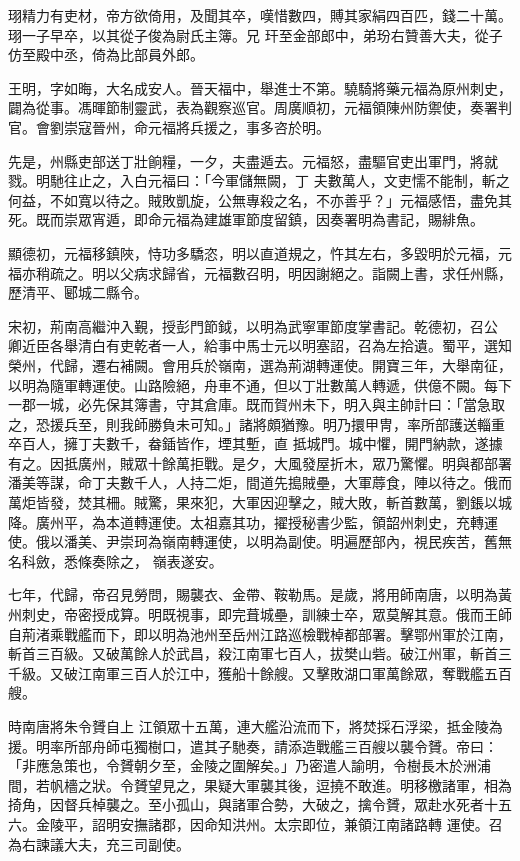 \begin{pinyinscope}
 珝精力有吏材，帝方欲倚用，及聞其卒，嘆惜數四，賻其家絹四百匹，錢二十萬。珝一子早卒，以其從子俊為尉氏主簿。兄
 玕至金部郎中，弟玢右贊善大夫，從子仿至殿中丞，倚為比部員外郎。



 王明，字如晦，大名成安人。晉天福中，舉進士不第。驍騎將藥元福為原州刺史，闢為從事。馮暉節制靈武，表為觀察巡官。周廣順初，元福領陳州防禦使，奏署判官。會劉崇寇晉州，命元福將兵援之，事多咨於明。



 先是，州縣吏部送丁壯餉糧，一夕，夫盡遁去。元福怒，盡驅官吏出軍門，將就戮。明馳往止之，入白元福曰：「今軍儲無闕，丁
 夫數萬人，文吏懦不能制，斬之何益，不如寬以待之。賊敗凱旋，公無專殺之名，不亦善乎？」元福感悟，盡免其死。既而崇眾宵遁，即命元福為建雄軍節度留鎮，因奏署明為書記，賜緋魚。



 顯德初，元福移鎮陜，恃功多驕恣，明以直道規之，忤其左右，多毀明於元福，元福亦稍疏之。明以父病求歸省，元福數召明，明因謝絕之。詣闕上書，求任州縣，歷清平、郾城二縣令。



 宋初，荊南高繼沖入覲，授彭門節鉞，以明為武寧軍節度掌書記。乾德初，召公
 卿近臣各舉清白有吏乾者一人，給事中馬士元以明塞詔，召為左拾遺。蜀平，選知榮州，代歸，遷右補闕。會用兵於嶺南，選為荊湖轉運使。開寶三年，大舉南征，以明為隨軍轉運使。山路險絕，舟車不通，但以丁壯數萬人轉遞，供億不闕。每下一郡一城，必先保其簿書，守其倉庫。既而賀州未下，明入與主帥計曰：「當急取之，恐援兵至，則我師勝負未可知。」諸將頗猶豫。明乃擐甲冑，率所部護送輜重卒百人，擁丁夫數千，畚鍤皆作，堙其塹，直
 抵城門。城中懼，開門納款，遂據有之。因抵廣州，賊眾十餘萬拒戰。是夕，大風發屋折木，眾乃驚懼。明與都部署潘美等謀，命丁夫數千人，人持二炬，間道先搗賊壘，大軍蓐食，陣以待之。俄而萬炬皆發，焚其柵。賊驚，果來犯，大軍因迎擊之，賊大敗，斬首數萬，劉鋹以城降。廣州平，為本道轉運使。太祖嘉其功，擢授秘書少監，領韶州刺史，充轉運使。俄以潘美、尹崇珂為嶺南轉運使，以明為副使。明遍歷部內，視民疾苦，舊無名科斂，悉條奏除之，
 嶺表遂安。



 七年，代歸，帝召見勞問，賜襲衣、金帶、鞍勒馬。是歲，將用師南唐，以明為黃州刺史，帝密授成算。明既視事，即完葺城壘，訓練士卒，眾莫解其意。俄而王師自荊渚乘戰艦而下，即以明為池州至岳州江路巡檢戰棹都部署。擊鄂州軍於江南，斬首三百級。又破萬餘人於武昌，殺江南軍七百人，拔樊山砦。破江州軍，斬首三千級。又破江南軍三百人於江中，獲船十餘艘。又擊敗湖口軍萬餘眾，奪戰艦五百艘。



 時南唐將朱令贇自上
 江領眾十五萬，連大艦沿流而下，將焚採石浮梁，抵金陵為援。明率所部舟師屯獨樹口，遣其子馳奏，請添造戰艦三百艘以襲令贇。帝曰：「非應急策也，令贇朝夕至，金陵之圍解矣。」乃密遣人諭明，令樹長木於洲浦間，若帆檣之狀。令贇望見之，果疑大軍襲其後，逗撓不敢進。明移檄諸軍，相為掎角，因督兵棹襲之。至小孤山，與諸軍合勢，大破之，擒令贇，眾赴水死者十五六。金陵平，詔明安撫諸郡，因命知洪州。太宗即位，兼領江南諸路轉
 運使。召為右諫議大夫，充三司副使。




\end{pinyinscope}

